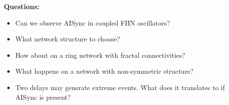 \documentclass[12pt,a4paper,final]{article}
\begin{document}
\textbf{Questions:}
\begin{itemize}
    \item Can we observe AISync in coupled FHN oscillators? 
    \item What network structure to choose?
    \item How about on a ring network with fractal connectivities?
    \item What happens on a network with non-symmetric structure? 
    \item Two delays may generate extreme events. What does it translates to 
    if AISync is present?
\end{itemize}
\end{document}
